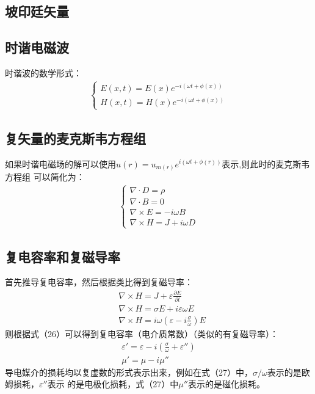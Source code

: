 \documentclass[UTF8]{article}
\begin{document}
\subsection{坡印廷矢量}

\subsection{时谐电磁波}
时谐波的数学形式：
\begin{gather}
    \begin{cases}
        E\left( x,t \right) =E\left( x \right) e^{-i(\omega t+\phi(x))} \\
        H\left( x,t \right) =H\left( x \right) e^{-i(\omega t+\phi(x))} 
    \end{cases}
\end{gather}
\subsection{复矢量的麦克斯韦方程组}
如果时谐电磁场的解可以使用$u(r)=u_{m(r)}e^{i(\omega t +\phi(r))}$表示,则此时的麦克斯韦方程组
可以简化为：
\begin{align}
    \begin{cases}
        \nabla \cdot D  =\rho                           \\
        \nabla \cdot B  =0                              \\
        \nabla \times E =-i\omega B \\
        \nabla \times H =J+i\omega D
    \end{cases}
\end{align}
\subsection{复电容率和复磁导率}
首先推导复电容率，然后根据类比得到复磁导率：
\begin{align}
    &\nabla \times H = J + \varepsilon \frac{\partial E}{\partial t}\\
    &\nabla \times H = \sigma E +i \varepsilon \omega E\\
    &\nabla \times H = i\omega(\varepsilon-i\frac{\sigma}{\omega})E
\end{align}
则根据式（26）可以得到复电容率（电介质常数）（类似的有复磁导率）：
\begin{align}
    \varepsilon' = \varepsilon -i(\frac{\sigma}{\omega}+\varepsilon'')\\
    \mu' = \mu -i\mu''
\end{align}
导电媒介的损耗均以复虚数的形式表示出来，例如在式（27）中，$\sigma/\omega$表示的是欧姆损耗，$\varepsilon''$表示
的是电极化损耗，式（27）中$\mu''$表示的是磁化损耗。
\end{document}
